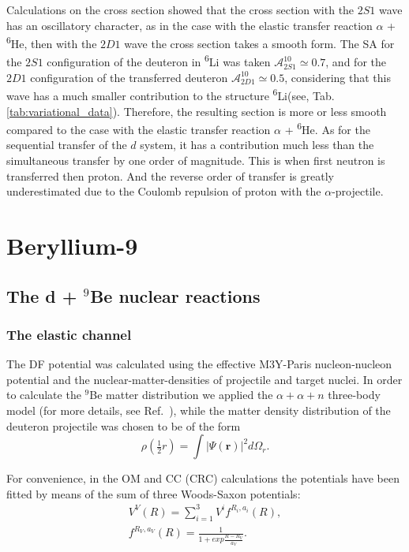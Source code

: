 \documentclass[
12pt, %
oneside, %
english, %
onehalfspacing, %
onehalfspacing, %
headsepline, %
]{MastersDoctoralThesis} %
\newcommand{\he}{\textsuperscript{6}He\xspace}
\newcommand{\li}{\textsuperscript{6}Li\xspace}
\begin{document}
Calculations on the cross section showed that the cross section with the $2S1$ wave has an oscillatory character, as in the case with the elastic transfer reaction $\alpha$ + \he, then with the $2D1$ wave the cross section takes a smooth form. 
The SA for the $2S1$ configuration of the deuteron in \li was taken $ \mathcal {A}^{10} _ {2S1} \simeq 0.7 $, and for the $2D1$ configuration of the transferred deuteron $ \mathcal{A}^ {10}_{2D1} \simeq 0.5 $, considering that this wave has a much smaller contribution to the structure \li (see, Tab. \ref{tab:variational_data}). Therefore, the resulting section is more or less smooth compared to the case with the elastic transfer reaction $\alpha$ + \he.
As for the sequential transfer of the $d$ system, it has a contribution much less than the simultaneous transfer by one order of magnitude. This is when first neutron is transferred then proton. And the reverse order of transfer is greatly underestimated due to the Coulomb repulsion of proton with the $\alpha$-projectile.

\clearpage




\chapter{Beryllium-9}
\section{The d + $^9$Be nuclear reactions}

\subsection{The elastic channel}
The DF potential was calculated using the effective M3Y-Paris nucleon-nucleon potential and the nuclear-matter-densities of projectile and target nuclei. In order to calculate the ${}^9$Be matter distribution we applied the $\alpha+\alpha+n$ three-body model (for more details, see Ref.~\cite{urazbekov2016}), while the matter density distribution of the deuteron projectile was chosen to be of the form
\begin{equation}
\rho\left( \tfrac{1}{2}r \right) =\int \vert \Psi (\textbf{r}) \vert ^2 d \Omega_r.
\end{equation}

For convenience, in the OM and CC (CRC) calculations the potentials have been fitted by means of the sum of three Woods-Saxon potentials:
\begin{eqnarray}
V^V(R) =  \sum_{i=1}^{3} V^i f^{R_i, a_i}(R), \\
 f^{R_V,a_V}(R)=\frac{1}{1+exp{\frac{R-R_V}{a_V}}}.
\end{eqnarray}
\end{document}
